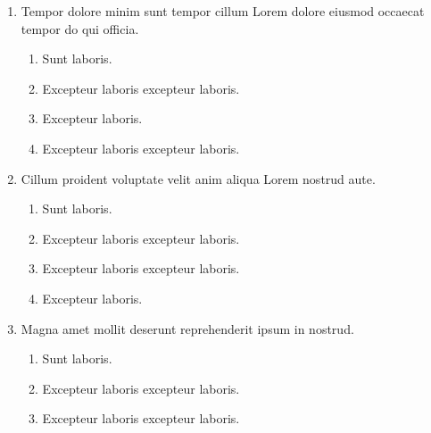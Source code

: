 \documentclass[a4paper,12pt]{article}
\begin{document}
\begin{enumerate}[label=\textbf{\arabic*.}]
\begin{multicols}{2}
\begin{enumerate}
		\item  Excepteur laboris excepteur laboris.
  
	\end{enumerate}

\end{multicols}
\item Tempor dolore minim sunt tempor cillum Lorem dolore eiusmod occaecat tempor do qui officia.
\begin{multicols}{2}
	\begin{enumerate}
		\item  Sunt laboris.
    
		\item  Excepteur laboris excepteur laboris.
    
		\item  Excepteur laboris.
    
		\item  Excepteur laboris excepteur laboris.
  
	\end{enumerate}

\end{multicols}
\item Cillum proident voluptate velit anim aliqua Lorem nostrud aute.
\begin{multicols}{2}
	\begin{enumerate}
		\item  Sunt laboris.
    
		\item  Excepteur laboris excepteur laboris.
    
		\item  Excepteur laboris excepteur laboris.
  
		\item  Excepteur laboris.
    
	\end{enumerate}

\end{multicols}
\item Magna amet mollit deserunt reprehenderit ipsum in nostrud.
\begin{multicols}{2}
	\begin{enumerate}
		\item  Sunt laboris.
    
		\item  Excepteur laboris excepteur laboris.
  
		\item  Excepteur laboris excepteur laboris.
    

\end{enumerate}
\end{multicols}
\end{enumerate}
\end{document}
